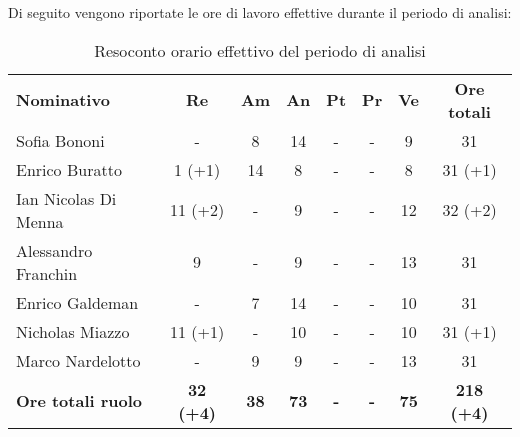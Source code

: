 \documentclass[../piano-di-progetto.tex]{subfiles}
\begin{document}
Di seguito vengono riportate le ore di lavoro effettive durante il periodo di analisi:
\begin{table}[H]
    \centering
    \begin{tabular}{lccccccc}
      \rowcolor{lightgray}
      \textbf{Nominativo}       & \textbf{Re}      & \textbf{Am} & \textbf{An}      & \textbf{Pt} & \textbf{Pr} & \textbf{Ve} & \textbf{Ore totali} \\
      Sofia Bononi              & -                & 8           & 14          & -           & -           & 9           & 31 \\
      Enrico Buratto            & 1 (+1)                & 14          & 8            & -           & -           & 8           & 31 (+1)             \\
      Ian Nicolas Di Menna      & 11 (+2)          & -           & 9           & -           & -           & 12          & 32  (+2)            \\
      Alessandro Franchin       & 9                & -           & 9            & -           & -           & 13          & 31              \\
      Enrico Galdeman           & -                & 7           & 14             & -           & -           & 10       & 31                   \\
      Nicholas Miazzo           & 11 (+1)          & -           & 10               & -           & -           & 10          & 31 (+1)             \\
      Marco Nardelotto          & -                & 9           & 9                & -           & -           & 13          & 31                  \\
      \textbf{Ore totali ruolo} & \textbf{32 (+4)} & \textbf{38} & \textbf{73} & \textbf{-}  & \textbf{-}  & \textbf{75} & \textbf{218 (+4)}       
      
    \end{tabular}
    \caption{Resoconto orario effettivo del periodo di analisi}
  \end{table}
\end{document}
